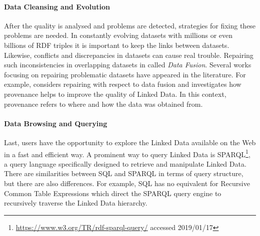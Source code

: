 \paragraph{Data Cleansing and Evolution}
After the quality is analysed and problems are detected, strategies for fixing these problems are needed. In constantly evolving datasets with millions or even billions of RDF triples it is important to keep the links between datasets. Likewise, conflicts and discrepancies in datasets can cause real trouble. Repairing such inconsistencies in overlapping datasets in called \emph{Data Fusion}. Several works focusing on repairing problematic datasets have appeared in the literature. For example, \cite{mendes2012} considers repairing with respect to data fusion and \cite{flouris2012} investigates how provenance helps to improve the quality of Linked Data. In this context, provenance refers to where and how the data was obtained from. 

\paragraph{Data Browsing and Querying}
Last, users have the opportunity to explore the Linked Data available on the Web in a fast and efficient way. A prominent way to query Linked Data is
SPARQL\footnote{\url{https://www.w3.org/TR/rdf-sparql-query/} accessed 2019/01/17}, a query language specifically designed to retrieve and manipulate Linked Data. There are similarities between SQL and SPARQL in terms of query structure, but there are also differences. For example, SQL
has no equivalent for Recursive Common Table Expressions which direct the SPARQL query engine to recursively traverse the Linked Data hierarchy. 

